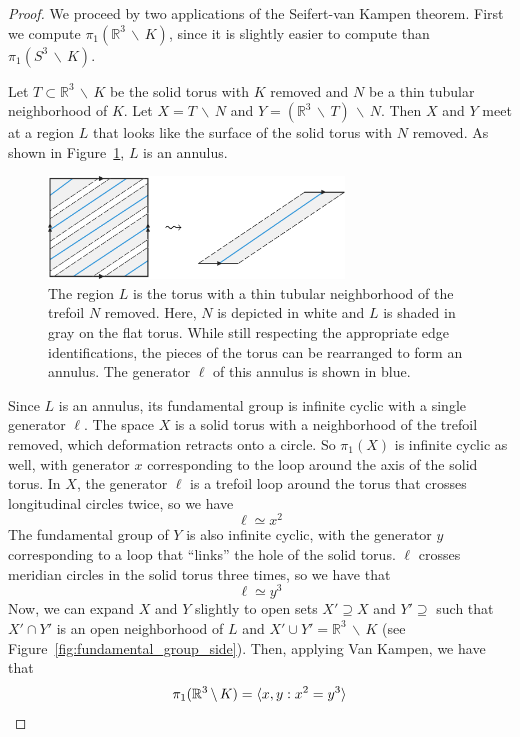 \documentclass[12pt,twoside]{reedthesis}
\theoremstyle{definition}
\newcommand{\R}{\mathbb{R}}
\newcommand{\wo}{\, \backslash \,}
\DeclarePairedDelimiter\ang{\langle}{\rangle}
\begin{document}
\begin{proof}
  We proceed by two applications of the Seifert-van Kampen theorem.
  First we compute $\pi_1(\R^3 \wo K)$, since it is slightly easier to compute than $\pi_1(S^3 \wo K)$.

  Let $T \subset \R^3 \wo K$ be the solid torus with $K$ removed and $N$ be a thin tubular neighborhood of $K$.
  Let $X = T \wo N$ and $Y = (\R^3 \wo T) \wo N$.
  Then $X$ and $Y$ meet at a region $L$ that looks like the surface of the solid torus with $N$ removed.
  As shown in Figure~\ref{fig:flat_annulus}, $L$ is an annulus.

  \begin{figure}[h]
    \centering
    \includegraphics[width=0.7\textwidth]{figures/fundamental_group_flat.pdf}
    \caption{The region $L$ is the torus with a thin tubular neighborhood of the trefoil $N$ removed. Here, $N$ is depicted in white and $L$ is shaded in gray on the flat torus. While still respecting the appropriate edge identifications, the pieces of the torus can be rearranged to form an annulus. The generator $\ell$ of this annulus is shown in blue.}
    \label{fig:flat_annulus}
  \end{figure}

  Since $L$ is an annulus, its fundamental group is infinite cyclic with a single generator $\ell$.
  The space $X$ is a solid torus with a neighborhood of the trefoil removed, which deformation retracts onto a circle.
  So $\pi_1(X)$ is infinite cyclic as well, with generator $x$ corresponding to the loop around the axis of the solid torus.
  In $X$, the generator $\ell$ is a trefoil loop around the torus that crosses longitudinal circles twice, so we have
  \begin{equation*}
    \ell \simeq x^2
  \end{equation*}
  The fundamental group of $Y$ is also infinite cyclic, with the generator $y$ corresponding to a loop that ``links'' the hole of the solid torus.
  $\ell$ crosses meridian circles in the solid torus three times, so we have that
  \begin{equation*}
    \ell \simeq y^3
  \end{equation*}
  Now, we can expand $X$ and $Y$ slightly to open sets $X' \supseteq X$ and $Y' \supseteq$ such that $X' \cap Y'$ is an open neighborhood of $L$ and $X' \cup Y' = \R^3 \wo K$ (see Figure~\ref{fig:fundamental_group_side}).
  Then, applying Van Kampen, we have that
  \begin{equation*}
    \pi_1(\R^3 \wo K) = \ang{x, y : x^2 = y^3}
  \end{equation*}


\end{proof}
\end{document}
